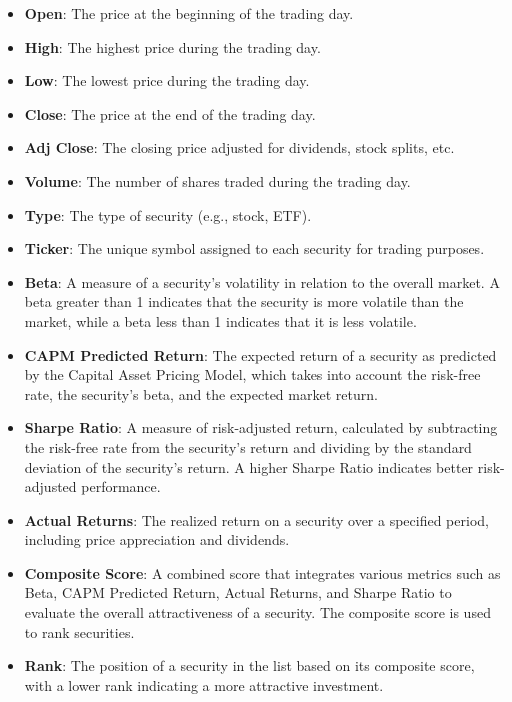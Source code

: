\begin{itemize}
    \item \textbf{Open}: The price at the beginning of the trading day.
    \item \textbf{High}: The highest price during the trading day.
    \item \textbf{Low}: The lowest price during the trading day.
    \item \textbf{Close}: The price at the end of the trading day.
    \item \textbf{Adj Close}: The closing price adjusted for dividends, stock splits, etc.
    \item \textbf{Volume}: The number of shares traded during the trading day.
    \item \textbf{Type}: The type of security (e.g., stock, ETF).
    \item \textbf{Ticker}: The unique symbol assigned to each security for trading purposes.
    \item \textbf{Beta}: A measure of a security's volatility in relation to the overall market. A beta greater than 1 indicates that the security is more volatile than the market, while a beta less than 1 indicates that it is less volatile.
    \item \textbf{CAPM Predicted Return}: The expected return of a security as predicted by the Capital Asset Pricing Model, which takes into account the risk-free rate, the security's beta, and the expected market return.
    \item \textbf{Sharpe Ratio}: A measure of risk-adjusted return, calculated by subtracting the risk-free rate from the security's return and dividing by the standard deviation of the security's return. A higher Sharpe Ratio indicates better risk-adjusted performance.
    \item \textbf{Actual Returns}: The realized return on a security over a specified period, including price appreciation and dividends.
    \item \textbf{Composite Score}: A combined score that integrates various metrics such as Beta, CAPM Predicted Return, Actual Returns, and Sharpe Ratio to evaluate the overall attractiveness of a security. The composite score is used to rank securities.
    \item \textbf{Rank}: The position of a security in the list based on its composite score, with a lower rank indicating a more attractive investment.
\end{itemize}

\newpage
